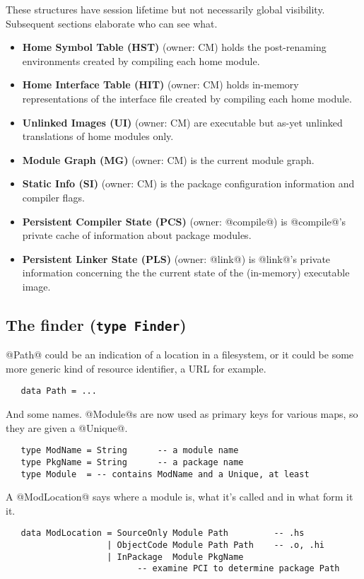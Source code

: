 \documentclass[11pt]{article}
\begin{document}
These structures have session lifetime but not necessarily global
visibility.  Subsequent sections elaborate who can see what.
\begin{itemize}
\item {\bf Home Symbol Table (HST)} (owner: CM) holds the post-renaming
      environments created by compiling each home module.
\item {\bf Home Interface Table (HIT)} (owner: CM) holds in-memory
      representations of the interface file created by compiling 
      each home module.
\item {\bf Unlinked Images (UI)} (owner: CM) are executable but as-yet
      unlinked translations of home modules only.
\item {\bf Module Graph (MG)} (owner: CM) is the current module graph.
\item {\bf Static Info (SI)} (owner: CM) is the package configuration
      information and compiler flags.
\item {\bf Persistent Compiler State (PCS)} (owner: @compile@)
      is @compile@'s private cache of information about package
      modules.
\item {\bf Persistent Linker State (PLS)} (owner: @link@) is
      @link@'s private information concerning the the current 
      state of the (in-memory) executable image.
\end{itemize}


\subsection{The finder (\mbox{\tt type Finder})}
\label{sec:finder}

@Path@ could be an indication of a location in a filesystem, or it
could be some more generic kind of resource identifier, a URL for
example.
\begin{verbatim}
   data Path = ...
\end{verbatim}

And some names.  @Module@s are now used as primary keys for various
maps, so they are given a @Unique@.
\begin{verbatim}
   type ModName = String      -- a module name
   type PkgName = String      -- a package name
   type Module  = -- contains ModName and a Unique, at least
\end{verbatim}

A @ModLocation@ says where a module is, what it's called and in what
form it it.
\begin{verbatim}
   data ModLocation = SourceOnly Module Path         -- .hs
                    | ObjectCode Module Path Path    -- .o, .hi
                    | InPackage  Module PkgName
                          -- examine PCI to determine package Path
\end{verbatim}
\end{document}
